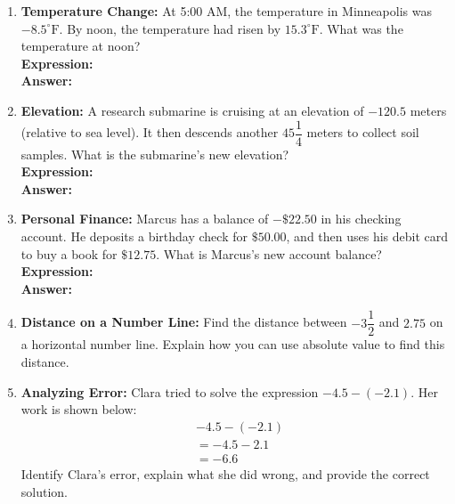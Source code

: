 \documentclass[12pt, letterpaper, fleqn]{article}
\newcommand{\blanklong}{\underline{\hspace{6.5cm}}}
\begin{document}
\begin{enumerate}[itemsep=4.2cm, leftmargin=0.6cm, resume]
\begin{enumerate}[itemsep=4.2cm, leftmargin=0.6cm, resume]
\item \textbf{Temperature Change:} At 5:00 AM, the temperature in Minneapolis was $-8.5^\circ\text{F}$. By noon, the temperature had risen by $15.3^\circ\text{F}$. What was the temperature at noon?
\\
\textbf{Expression:} \blanklong \\
\textbf{Answer:} \blanklong
\item \textbf{Elevation:} A research submarine is cruising at an elevation of $-120.5$ meters (relative to sea level). It then descends another $45\dfrac{1}{4}$ meters to collect soil samples. What is the submarine's new elevation?
\\
\textbf{Expression:} \blanklong \\
\textbf{Answer:} \blanklong
\item \textbf{Personal Finance:} Marcus has a balance of $-\$22.50$ in his checking account. He deposits a birthday check for $\$50.00$, and then uses his debit card to buy a book for $\$12.75$. What is Marcus's new account balance?
\\
\textbf{Expression:} \blanklong \\
\textbf{Answer:} \blanklong
\item \textbf{Distance on a Number Line:} Find the distance between $-3\dfrac{1}{2}$ and $2.75$ on a horizontal number line. Explain how you can use absolute value to find this distance.
\item \textbf{Analyzing Error:} Clara tried to solve the expression $-4.5 - (-2.1)$. Her work is shown below:
\begin{align*}
    &-4.5 - (-2.1) \\
    &= -4.5 - 2.1 \\
    &= -6.6
\end{align*}
Identify Clara's error, explain what she did wrong, and provide the correct solution.
\end{enumerate}

\end{enumerate}
\end{document}
